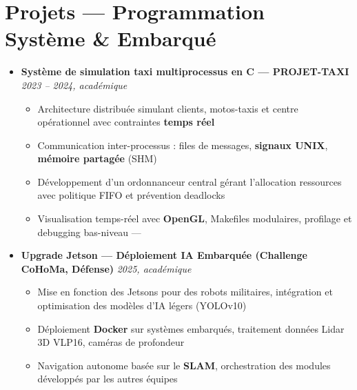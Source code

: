 \documentclass[a4paper,11pt]{article}
\begin{document}
\section{Projets — Programmation Système \& Embarqué}
\begin{itemize}[leftmargin=*, label={}]

    \item \textbf{Système de simulation taxi multiprocessus en C — PROJET-TAXI} \hfill \textit{2023 -- 2024, académique}
    \vspace{-2pt}
    \begin{itemize}[leftmargin=0.4cm, nosep, label=\tiny$\bullet$]
        \item \small{Architecture distribuée simulant clients, motos-taxis et centre opérationnel avec contraintes \textbf{temps réel}}
        \item \small{Communication inter-processus : files de messages, \textbf{signaux UNIX}, \textbf{mémoire partagée} (SHM)}
        \item \small{Développement d'un ordonnanceur central gérant l'allocation ressources avec politique FIFO et prévention deadlocks}
        \item \small{Visualisation temps-réel avec \textbf{OpenGL}, Makefiles modulaires, profilage et debugging bas-niveau — \href{https://github.com/Nameless0l/PROJET-TAXI}{\faGithub}}
    \end{itemize}
    \vspace{4pt}

    \item \textbf{Upgrade Jetson — Déploiement IA Embarquée (Challenge CoHoMa, Défense)} \hfill \textit{2025, académique}
    \vspace{-2pt}
    \begin{itemize}[leftmargin=0.4cm, nosep, label=\tiny$\bullet$]
        \item \small{Mise en fonction des Jetsons pour des robots militaires, intégration et optimisation des modèles d'IA légers (YOLOv10)}
        \item \small{Déploiement \textbf{Docker} sur systèmes embarqués, traitement données Lidar 3D VLP16, caméras de profondeur}
        \item \small{Navigation autonome basée sur le \textbf{SLAM}, orchestration des modules développés par les autres équipes}
    \end{itemize}
    \vspace{4pt}


\end{itemize}
\end{document}
